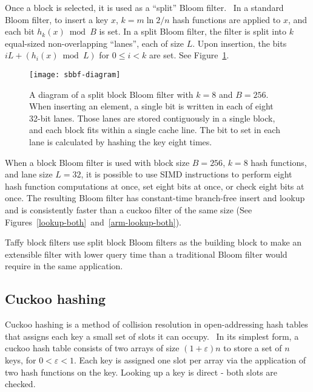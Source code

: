 \documentclass[sigconf, nonacm]{acmart}
\begin{document}
Once a block is selected, it is used as a ``split'' Bloom filter.~\cite{split-bloom}
In a standard Bloom filter, to insert a key $x$, $k = m \ln 2 / n$ hash functions are applied to $x$, and each bit $h_k(x) \bmod B$ is set.
In a split Bloom filter, the filter is split into $k$ equal-sized non-overlapping ``lanes'', each of size $L$.
Upon insertion, the bits $i L + (h_i(x) \bmod L)$ for $0 \le i < k$ are set.
See Figure~\ref{sbbf-diagram}.

\begin{figure}
  \texttt{[image: sbbf-diagram]}
\caption{\label{sbbf-diagram}
A diagram of a split block Bloom filter with $k = 8$ and $B = 256$.
When inserting an element, a single bit is written in each of eight 32-bit lanes.
Those lanes are stored contiguously in a single block, and each block fits within a single cache line.
The bit to set in each lane is calculated by hashing the key eight times.
}
\end{figure}

When a block Bloom filter is used with block size $B = 256$, $k = 8$ hash functions, and lane size $L = 32$, it is possible to use SIMD instructions to perform eight hash function computations at once, set eight bits at once, or check eight bits at once.
The resulting Bloom filter has constant-time branch-free insert and lookup and is consistently faster than a cuckoo filter of the same size (See Figures~\ref{lookup-both}~and~\ref{arm-lookup-both}).~\cite{cuckoo-filter-github,ultra-fast,overtakes,impala-bloom}

Taffy block filters use split block Bloom filters as the building block to make an extensible filter with lower query time than a traditional Bloom filter would require in the same application.

\subsection{Cuckoo hashing}

Cuckoo hashing is a method of collision resolution in open-addressing hash tables that assigns each key a small set of slots it can occupy.~\cite{cuckoo-journal}
In its simplest form, a cuckoo hash table consists of two arrays of size $(1 + \varepsilon)n$ to store a set of $n$ keys, for $0 < \varepsilon < 1$.
Each key is assigned one slot per array via the application of two hash functions on the key.
Looking up a key is direct - both slots are checked.
\end{document}
